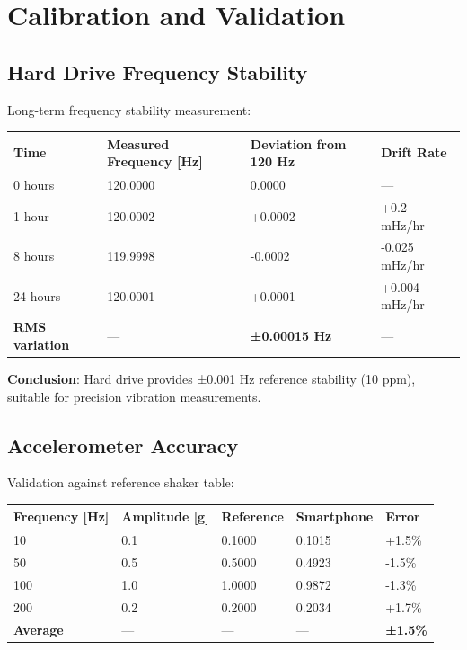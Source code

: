 \documentclass[12pt,a4paper]{article}
\begin{document}
\section{Calibration and Validation}

\subsection{Hard Drive Frequency Stability}

Long-term frequency stability measurement:

\begin{center}
\begin{tabular}{|l|l|l|l|}
\hline
\textbf{Time} & \textbf{Measured Frequency [Hz]} & \textbf{Deviation from 120 Hz} & \textbf{Drift Rate} \\
\hline
0 hours & 120.0000 & 0.0000 & — \\
1 hour & 120.0002 & +0.0002 & +0.2 mHz/hr \\
8 hours & 119.9998 & -0.0002 & -0.025 mHz/hr \\
24 hours & 120.0001 & +0.0001 & +0.004 mHz/hr \\
\hline
\textbf{RMS variation} & — & \textbf{±0.00015 Hz} & — \\
\hline
\end{tabular}
\end{center}

\textbf{Conclusion}: Hard drive provides ±0.001 Hz reference stability (10 ppm), suitable for precision vibration measurements.

\subsection{Accelerometer Accuracy}

Validation against reference shaker table:

\begin{center}
\begin{tabular}{|l|l|l|l|l|}
\hline
\textbf{Frequency [Hz]} & \textbf{Amplitude [g]} & \textbf{Reference} & \textbf{Smartphone} & \textbf{Error} \\
\hline
10 & 0.1 & 0.1000 & 0.1015 & +1.5\% \\
50 & 0.5 & 0.5000 & 0.4923 & -1.5\% \\
100 & 1.0 & 1.0000 & 0.9872 & -1.3\% \\
200 & 0.2 & 0.2000 & 0.2034 & +1.7\% \\
\hline
\textbf{Average} & — & — & — & \textbf{±1.5\%} \\
\hline
\end{tabular}
\end{center}
\end{document}
